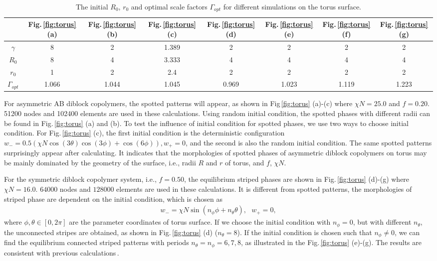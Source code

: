 \documentclass[final,1p,times]{elsarticle}
\begin{document}
\begin{table}[H]
\caption{
    The initial $R_0$, $r_0$ and optimal scale factors $\Gamma_{opt}$ for 
different simulations on the torus surface. }
  \label{tab:radius:torus}
  \centering
\begin{tabular}{|c|c|c|c|c|c|c|c|}
 \hline
 & Fig.\,\ref{fig:torus} (a) & Fig.\,\ref{fig:torus} (b)
    & Fig.\,\ref{fig:torus} (c)& Fig.\,\ref{fig:torus}(d) &
    Fig.\,\ref{fig:torus}(e) &   Fig.\,\ref{fig:torus}(f) &
	Fig.\,\ref{fig:torus}(g) 
    \\ \hline
    $\gamma$ & 8 & 2 & 1.389 &2 &2 & 2 & 2
    \\ \hline
    $R_0$     & 8  & 4 & 3.333 & 4 & 4 & 4 & 4
    \\ \hline
    $r_0$     & 1  & 2 & 2.4 & 2 & 2 & 2 & 2  
	\\ \hline
	$\Gamma_{opt}$ & 1.066 & 1.044 & 1.045 & 0.969 & 1.023 & 1.119 & 1.223
    \\ \hline 
\end{tabular}
\end{table}


For asymmetric AB diblock copolymers, the spotted patterns will appear, as
shown in Fig\,\ref{fig:torus} (a)-(c) where $\chi N = 25.0$ and $f=0.20$.
51200 nodes and 102400 elements are used in these calculations.  Using random
initial condition, the spotted phases with different radii can be found in
Fig.\,\ref{fig:torus} (a) and (b).  To test the influence of initial condition
for spotted phases, we use two ways to choose initial condition.  For
Fig.\,\ref{fig:torus} (c),  the first initial
condition is the deterministic configuration $w_{-} = 0.5(\chi
N\cos(3\theta)\cos(3\phi)+\cos(6\phi)), w_{+} = 0$, and the second is
also the random initial condition.  The same spotted patterns surprisingly
appear after calculating. It indicates that the morphologies of spotted phases
of asymmetric diblock copolymers on torus may be mainly dominated by the geometry
of the surface, i.e., radii $R$ and $r$ of torus, and $f$, $\chi N$.


For the symmetric diblock copolymer system, i.e., $f=0.50$, the equilibrium
striped phases are shown in Fig.\,\ref{fig:torus} (d)-(g) where $\chi N =
16.0$.  $64000$ nodes and $128000$ elements are used in these calculations.  It
is different from spotted patterns, the morphologies of striped phase are
dependent on the initial condition, which is chosen as 
\begin{align*}
    w_- =\chi N\sin(n_\phi \phi + n_\theta \theta), ~~~ w_+ = 0,
\end{align*}
where $\phi, \theta\in[0,2\pi]$ are the parameter coordinates of
torus surface.  If we choose the initial condition with $n_\phi=0$, but with
different $n_\theta$, the unconnected stripes are obtained, as
shown in Fig.\,\ref{fig:torus} (d) ($n_\theta = 8$).
If the initial condition is chosen such that $n_\phi \neq 0$, we
can find the equilibrium connected striped patterns with periods
$n_\theta = n_\phi = 6, 7, 8$, as illustrated in the
Fig.\,\ref{fig:torus} (e)-(g). The results are consistent with
previous calculations\,\cite{li2014mean}.
\end{document}
